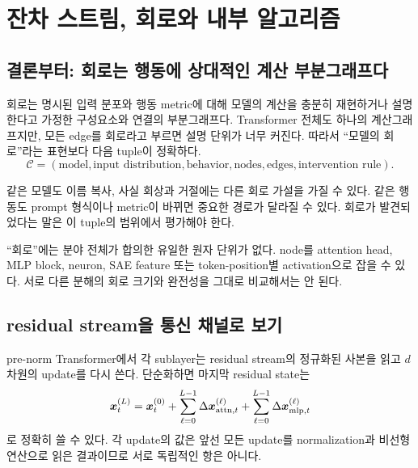 \chapter{잔차 스트림, 회로와 내부 알고리즘}
\label{chap:phase5}

\section{결론부터: 회로는 행동에 상대적인 계산 부분그래프다}

회로는 명시된 입력 분포와 행동 metric에 대해 모델의 계산을 충분히 재현하거나 설명한다고 가정한 구성요소와 연결의 부분그래프다.
Transformer 전체도 하나의 계산그래프지만, 모든 edge를 회로라고 부르면 설명 단위가 너무 커진다.
따라서 ``모델의 회로''라는 표현보다 다음 tuple이 정확하다.
\begin{equation}
  \mathcal{C}=(\text{model},\text{input distribution},
  \text{behavior},\text{nodes},\text{edges},\text{intervention rule}).
\end{equation}

같은 모델도 이름 복사, 사실 회상과 거절에는 다른 회로 가설을 가질 수 있다.
같은 행동도 prompt 형식이나 metric이 바뀌면 중요한 경로가 달라질 수 있다.
회로가 발견되었다는 말은 이 tuple의 범위에서 평가해야 한다.

\begin{limitbox}
``회로''에는 분야 전체가 합의한 유일한 원자 단위가 없다.
node를 attention head, MLP block, neuron, SAE feature 또는 token-position별 activation으로 잡을 수 있다.
서로 다른 분해의 회로 크기와 완전성을 그대로 비교해서는 안 된다.
\end{limitbox}

\section{residual stream을 통신 채널로 보기}

pre-norm Transformer에서 각 sublayer는 residual stream의 정규화된 사본을 읽고 $d$차원의 update를 다시 쓴다.
단순화하면 마지막 residual state는
\begin{equation}
  \bm{x}^{(L)}_t=\bm{x}^{(0)}_t+
  \sum_{\ell=0}^{L-1}\Delta\bm{x}^{(\ell)}_{\mathrm{attn},t}+
  \sum_{\ell=0}^{L-1}\Delta\bm{x}^{(\ell)}_{\mathrm{mlp},t}
  \label{eq:residual-sum}
\end{equation}
로 정확히 쓸 수 있다.
각 update의 값은 앞선 모든 update를 normalization과 비선형 연산으로 읽은 결과이므로 서로 독립적인 항은 아니다.

